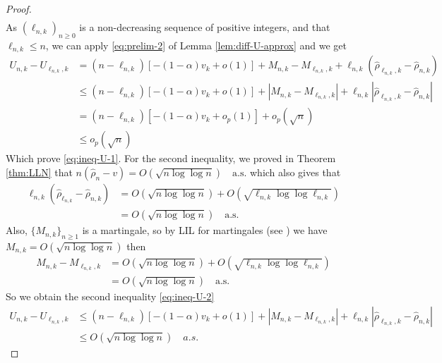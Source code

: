 \begin{proof}
\begin{align}
	\end{align}
	As \(\left(\ell_{n,k}\right)_{n \geq 0}\) is a non-decreasing sequence of positive integers, and that \(\ell_{n,k} \leq n\), we can apply \eqref{eq:prelim-2} of Lemma \ref{lem:diff-U-approx} and we get
	\begin{align*}
		U_{n,k} - U_{\ell_{n,k},k} &= (n - \ell_{n,k})[-(1 - \alpha)v_k + o(1)] + M_{n,k} - M_{\ell_{n,k},k} + \ell_{n,k} (\hat{\rho}_{\ell_{n,k},k} - \hat{\rho}_{n,k})\\
		&\leq (n - \ell_{n,k})[-(1 - \alpha)v_k + o(1)] + |M_{n,k} - M_{\ell_{n,k},k}| + \ell_{n,k} |\hat{\rho}_{\ell_{n,k},k} - \hat{\rho}_{n,k}|\\
		&= (n - \ell_{n,k})[-(1 - \alpha)v_k + o_p(1)] + o_p(\sqrt{n})\\
		&\leq o_p(\sqrt{n}) 
	\end{align*}
	Which prove \eqref{eq:ineq-U-1}. For the second inequality, we proved in Theorem \ref{thm:LLN} that \(n(\hat{\rho}_n - v) = O\left(\sqrt{n \log \log n}\right) \quad \text{a.s.}\) which also gives that
	\begin{align*}
		\ell_{n,k}(\hat{\rho}_{\ell_{n,k}} - \hat{\rho}_{n,k}) &= O\left(\sqrt{n \log \log n}\right) + O\left(\sqrt{\ell_{n,k} \log \log \ell_{n,k}}\right) \\
		&= O\left(\sqrt{n \log \log n}\right) \quad \text{a.s.}
	\end{align*}
	Also, $\{M_{n,k}\}_{n \geq 1}$ is a martingale, so by LIL for martingales (see \cite{Stout1970}) we have \(M_{n,k} = O\left(\sqrt{n \log\!\log n}\right)\) then
	\begin{align*}
		M_{n,k} - M_{\ell_{n,k},k} &= O\left(\sqrt{n \log\!\log n}\right) + O\left(\sqrt{\ell_{n,k} \log\!\log \ell_{n,k}}\right)\\
		&= O\left(\sqrt{n \log\!\log n}\right) \quad \text{a.s.}
	\end{align*}
	So we obtain the second inequality \eqref{eq:ineq-U-2}
	\begin{align*}
		U_{n,k} - U_{\ell_{n,k},k} &\leq (n - \ell_{n,k})[-(1 - \alpha)v_k + o(1)] + |M_{n,k} - M_{\ell_{n,k},k}| + \ell_{n,k} |\hat{\rho}_{\ell_{n,k},k} - \hat{\rho}_{n,k}|\\			
		&\leq O\left(\sqrt{n \log \log n}\right) \quad a.s.
	\end{align*}
\end{proof}
%	
%		
